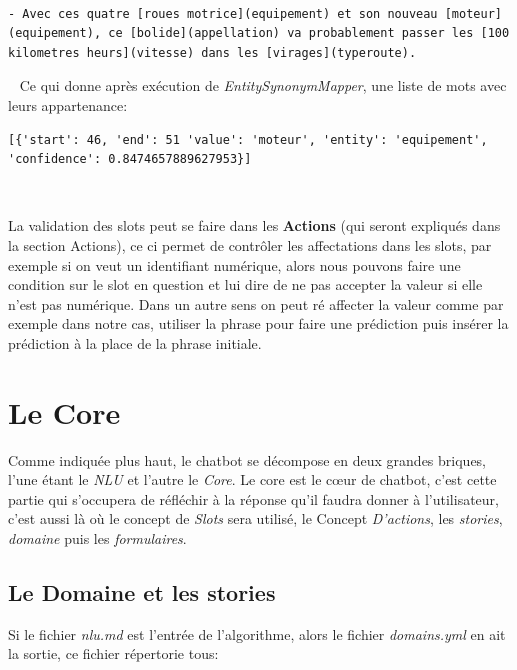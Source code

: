 \ \linebreak
\begin{lstlisting}
- Avec ces quatre [roues motrice](equipement) et son nouveau [moteur](equipement), ce [bolide](appellation) va probablement passer les [100 kilometres heurs](vitesse) dans les [virages](typeroute).
\end{lstlisting}

\ \linebreak
Ce qui donne après exécution de \textit{EntitySynonymMapper}, une liste de mots avec leurs appartenance:

\begin{lstlisting}
[{'start': 46, 'end': 51 'value': 'moteur', 'entity': 'equipement', 'confidence': 0.8474657889627953}]
\end{lstlisting}
\ \linebreak 

La validation des slots peut se faire dans les \textbf{Actions} (qui seront expliqués dans la section Actions), ce ci permet de contrôler les affectations dans les slots, par exemple si on veut un identifiant numérique, alors nous pouvons faire une condition sur le slot en question et lui dire de ne  pas accepter la valeur si elle n'est pas numérique. Dans un autre sens on peut ré affecter la valeur comme par exemple dans notre cas, utiliser la phrase pour faire une prédiction puis insérer la prédiction à la place de la phrase initiale.

\chapter{Le Core}

Comme indiquée plus haut, le chatbot se décompose en deux grandes briques, l'une étant le \textit{NLU} et l'autre le \textit{Core}. Le core est le cœur de chatbot, c'est cette partie qui s'occupera de réfléchir à la réponse qu'il faudra donner à l'utilisateur, c'est aussi là où le concept de \textit{Slots} sera utilisé, le Concept \textit{D'actions}, les \textit{stories}, \textit{domaine} puis les \textit{formulaires}.\\
\pagebreak

\section{Le Domaine et les stories}
Si le fichier \textit{nlu.md} est l'entrée de l'algorithme, alors le fichier \textit{domains.yml} en ait la sortie, ce fichier répertorie tous:

